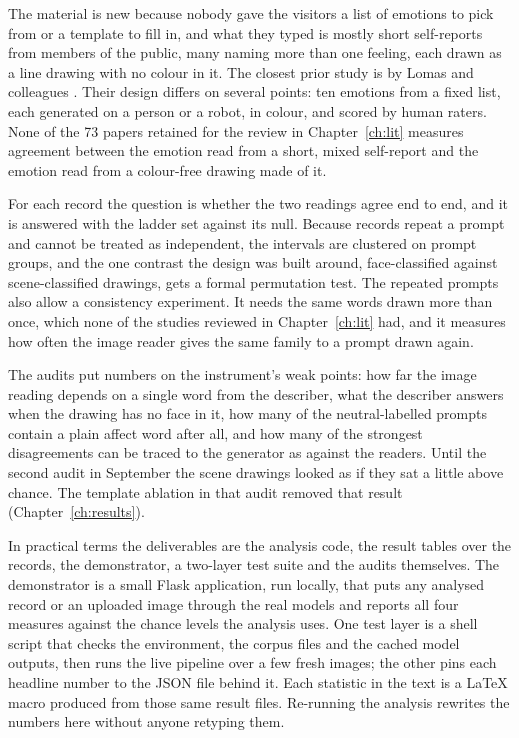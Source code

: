 The material is new because nobody gave the visitors a list of emotions to pick from or a template to fill in, and what they typed is mostly short self-reports from members of the public, many naming more than one feeling, each drawn as a line drawing with no colour in it. The closest prior study is by Lomas and colleagues \cite{lomas2024improved}. Their design differs on several points: ten emotions from a fixed list, each generated on a person or a robot, in colour, and scored by human raters. None of the 73 papers retained for the review in Chapter~\ref{ch:lit} measures agreement between the emotion read from a short, mixed self-report and the emotion read from a colour-free drawing made of it.

For each record the question is whether the two readings agree end to end, and it is answered with the ladder set against its null. Because \nRepeats{} records repeat a prompt and cannot be treated as independent, the intervals are clustered on prompt groups, and the one contrast the design was built around, face-classified against scene-classified drawings, gets a formal permutation test. The repeated prompts also allow a consistency experiment. It needs the same words drawn more than once, which none of the studies reviewed in Chapter~\ref{ch:lit} had, and it measures how often the image reader gives the same family to a prompt drawn again.

The audits put numbers on the instrument's weak points: how far the image reading depends on a single word from the describer, what the describer answers when the drawing has no face in it, how many of the neutral-labelled prompts contain a plain affect word after all, and how many of the strongest disagreements can be traced to the generator as against the readers. Until the second audit in September the scene drawings looked as if they sat a little above chance. The template ablation in that audit removed that result (Chapter~\ref{ch:results}).

In practical terms the deliverables are the analysis code, the result tables over the \nAnalysed{} records, the demonstrator, a two-layer test suite and the audits themselves. The demonstrator is a small Flask application, run locally, that puts any analysed record or an uploaded image through the real models and reports all four measures against the chance levels the analysis uses. One test layer is a shell script that checks the environment, the corpus files and the cached model outputs, then runs the live pipeline over a few fresh images; the other pins each headline number to the JSON file behind it. Each statistic in the text is a LaTeX macro produced from those same result files. Re-running the analysis rewrites the numbers here without anyone retyping them.

